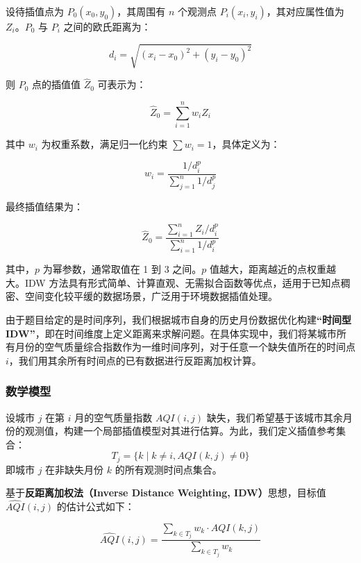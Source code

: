 \documentclass[a4paper,12pt]{article}
\begin{document}
	设待插值点为 $P_0(x_0, y_0)$，其周围有 $n$ 个观测点 $P_i(x_i, y_i)$，其对应属性值为 $Z_i$。$P_0$ 与 $P_i$ 之间的欧氏距离为：
	
	\begin{equation}
		d_i = \sqrt{(x_i - x_0)^2 + (y_i - y_0)^2}
	\end{equation}
	
	则 $P_0$ 点的插值值 $\hat{Z}_0$ 可表示为：
	
	\begin{equation}
		\hat{Z}_0 = \sum_{i=1}^{n} w_i Z_i
	\end{equation}
	
	其中 $w_i$ 为权重系数，满足归一化约束 $\sum w_i = 1$，具体定义为：
	
	\begin{equation}
		w_i = \frac{1/d_i^p}{\sum_{j=1}^{n} 1/d_j^p}
	\end{equation}
	
	最终插值结果为：
	
	\begin{equation}
		\hat{Z}_0 = \frac{\sum_{i=1}^{n} Z_i / d_i^p}{\sum_{i=1}^{n} 1 / d_i^p}
	\end{equation}
	
	其中，$p$ 为幂参数，通常取值在 1 到 3 之间。$p$ 值越大，距离越近的点权重越大。IDW 方法具有形式简单、计算直观、无需拟合函数等优点，适用于已知点稠密、空间变化较平缓的数据场景，广泛用于环境数据插值处理。
	
	由于题目给定的是时间序列，我们根据城市自身的历史月份数据优化构建\textbf{“时间型 IDW”}，即在时间维度上定义距离来求解问题。在具体实现中，我们将某城市所有月份的空气质量综合指数作为一维时间序列，对于任意一个缺失值所在的时间点 $i$，我们用其余所有时间点的已有数据进行反距离加权计算。
	
	\subsubsection{数学模型}
	
	设城市 $j$ 在第 $i$ 月的空气质量指数 $AQI(i,j)$ 缺失，我们希望基于该城市其余月份的观测值，构建一个局部插值模型对其进行估算。为此，我们定义插值参考集合：
	\[
	T_j = \{k \mid k \neq i, AQI(k,j) \neq 0\}
	\]
	即城市 $j$ 在非缺失月份 $k$ 的所有观测时间点集合。
	
	基于\textbf{反距离加权法（Inverse Distance Weighting, IDW）}思想，目标值 $\hat{AQI}(i,j)$ 的估计公式如下：
	
	\begin{equation}
		\widehat{AQI}(i,j) = \frac{\displaystyle\sum_{k \in T_j} w_k \cdot AQI(k,j)}{\displaystyle\sum_{k \in T_j} w_k}
		\label{eq:idw_general}
	\end{equation}
	
\end{document}

